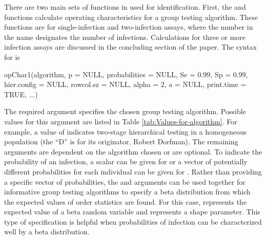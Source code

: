 There are two main sets of functions in  used for
identification. First, the  and 
functions calculate operating characteristics for a group testing
algorithm. These functions are for single-infection and two-infection
assays, where the number in the name designates the number of infections.
Calculations for three or more infection assays are discussed in the
concluding section of the paper. The syntax for 
is 

\begin{Schunk}
\begin{Sinput}
opChar1(algorithm, p = NULL, probabilities = NULL, Se = 0.99,
    Sp = 0.99, hier.config = NULL, rowcol.sz = NULL, alpha = 2,
    a = NULL, print.time = TRUE, ...)
\end{Sinput}
\end{Schunk}

\noindent \texttt{}The required  argument specifies
the chosen group testing algorithm. Possible values for this argument
are listed in Table \ref{tab:Values-for-algorithm}. For example,
a value of  indicates two-stage hierarchical testing in
a homogeneous population (the ``D'' is for its originator, Robert
Dorfman). The remaining arguments are dependent on the algorithm chosen
or are optional. To indicate the probability of an infection, a scalar
can be given for  or a vector of potentially different
probabilities for each individual can be given for . Rather than
providing a specific vector of probabilities, the  and 
arguments can be used together for informative group testing algorithms
to specify a beta distribution from which the expected values of order
statistics are found. For this case,  represents the expected
value of a beta random variable and  represents a shape
parameter. This type of specification is helpful when probabilities
of infection can be characterized well by a beta distribution.

